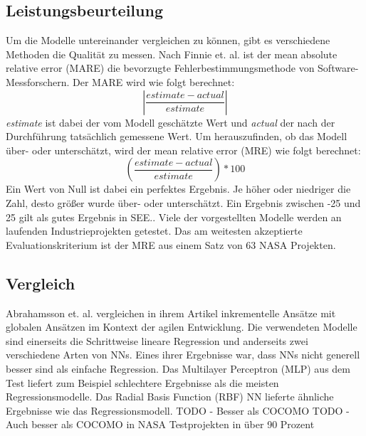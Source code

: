 \subsection{Leistungsbeurteilung}
Um die Modelle untereinander vergleichen zu können, gibt es verschiedene Methoden die Qualität zu messen. Nach Finnie et. al. ist der mean absolute relative error (MARE) die bevorzugte Fehlerbestimmungsmethode von Software-Messforschern. Der MARE wird wie folgt berechnet:
\begin{equation}
\left|\frac{estimate - actual}{estimate}\right|
\end{equation}
\textit{estimate} ist dabei der vom Modell geschätzte Wert und \textit{actual} der nach der Durchführung tatsächlich gemessene Wert. Um herauszufinden, ob das Modell über- oder unterschätzt, wird der mean relative error (MRE) wie folgt berechnet:
\begin{equation}
\left(\frac{estimate - actual}{estimate}\right)*100
\end{equation}
Ein Wert von Null ist dabei ein perfektes Ergebnis. Je höher oder niedriger die Zahl, desto größer wurde über- oder unterschätzt.\cite{Finnie1996} Ein Ergebnis zwischen -25 und 25 gilt als gutes Ergebnis in SEE.\cite{Abrahamsson2007}. Viele der vorgestellten Modelle werden an laufenden Industrieprojekten getestet. Das am weitesten akzeptierte Evaluationskriterium ist der MRE aus einem Satz von 63 NASA Projekten.\cite{Khalifelu2012}

\subsection{Vergleich}
Abrahamsson et. al. vergleichen in ihrem Artikel inkrementelle Ansätze mit globalen Ansätzen im Kontext der agilen Entwicklung. Die verwendeten Modelle sind einerseits die Schrittweise lineare Regression und anderseits zwei verschiedene Arten von NNs. Eines ihrer Ergebnisse war, dass NNs nicht generell besser sind als einfache Regression. Das Multilayer Perceptron (MLP) aus dem Test liefert zum Beispiel schlechtere Ergebnisse als die meisten Regressionsmodelle. Das Radial Basis Function (RBF)  NN lieferte ähnliche Ergebnisse wie das Regressionsmodell.\cite{Abrahamsson2007}
TODO - Besser als COCOMO\cite{Khalifelu2012} %
TODO - Auch besser als COCOMO in NASA Testprojekten in über 90 Prozent\cite{Gharehchopogh2011} %

